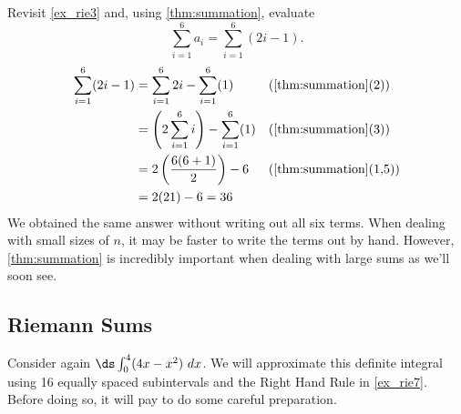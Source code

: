 {Revisit \autoref{ex_rie3} and, using \autoref{thm:summation}, evaluate \[\sum_{i=1}^6 a_i = \sum_{i=1}^6 (2i-1).\]
}
{\begin{align*}
\sum_{i=1}^6 (2i-1)
&=\sum_{i=1}^6 2i-\sum_{i=1}^6 (1) && \text{(\autoref{thm:summation}(2))}\\
&=\left( 2\sum_{i=1}^6 i\right) -\sum_{i=1}^6 (1)
&& \text{(\autoref{thm:summation}(3))}\\
&=2\left(\frac{6(6+1)}{2}\right)-6 && \text{(\autoref{thm:summation}(1,5))}\\
&=2(21)-6=36
\end{align*}
We obtained the same answer without writing out all six terms. When dealing with small sizes of $n$, it may be faster to write the terms out by hand. However, \autoref{thm:summation} is incredibly important when dealing with large sums as we'll soon see.}
 
\subsection{Riemann Sums}

Consider again $\ds\int_0^4(4x-x^2)\ dx$. We will approximate this definite integral using 16 equally spaced subintervals and the Right Hand Rule in \autoref{ex_rie7}. Before doing so, it will pay to do some careful preparation.


